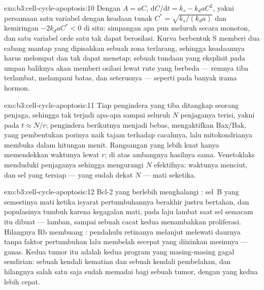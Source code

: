\begin{solution}{exo:b3:cell-cycle-apoptosis:10}
Dengan $A = aC$, $\mathrm{d}C/\mathrm{d}t = k_{s} - k_{d}aC^{2}$, yakni
persamaan satu variabel dengan keadaan tunak $C^{*} = \sqrt{k_{s}/(k_{d}a)}$
dan kemiringan $-2k_{d}aC^{*} < 0$ di situ: simpangan apa pun meluruh
secara monoton, dan satu variabel orde satu tak dapat berosilasi. Kurva
berbentuk S memberi dua cabang mantap yang dipisahkan sebuah zona terlarang,
sehingga keadaannya harus melompat dan tak dapat menetap; sebuah tundaan yang
eksplisit pada umpan baliknya akan memberi osilasi lewat rute yang berbeda ---
remnya tiba terlambat, melampaui batas, dan seterusnya --- seperti pada banyak
irama hormon.
\end{solution}

\begin{solution}{exo:b3:cell-cycle-apoptosis:11}
Tiap pengindera yang tiba ditangkap seorang penjaga, sehingga tak terjadi
apa-apa sampai seluruh $N$ penjaganya terisi, yakni pada $t \approx N/r$;
pengindera berikutnya menjadi bebas, mengaktifkan Bax/Bak, yang pembentukan
porinya naik tajam terhadap cacahnya, lalu mitokondrianya membuka dalam
hitungan menit. Rangsangan yang lebih kuat hanya memendekkan waktunya lewat
$r$; di atas ambangnya hasilnya sama. Venetoklaks menduduki penjaganya
sehingga mengurangi $N$ efektifnya: waktunya menciut, dan sel yang tersiap ---
yang sudah dekat $N$ --- mati seketika.
\end{solution}

\begin{solution}{exo:b3:cell-cycle-apoptosis:12}
Bcl-2 yang berlebih menghalangi : sel~B yang semestinya mati
ketika isyarat pertumbuhannya berakhir justru bertahan, dan populasinya tumbuh
karena kegagalan mati, pada laju lambat saat sel semacam itu dibuat ---
lamban, sampai sebuah cacat kedua menambahkan proliferasi. Hilangnya Rb
membuang : pendahulu retinanya melanjut melewati daurnya
tanpa faktor pertumbuhan lalu membelah secepat yang diizinkan mesinnya ---
ganas. Kedua tumor itu adalah kedua program yang masing-masing gagal
sendirian: sebuah kendali kematian dan sebuah kendali pembelahan, dan
hilangnya salah satu saja sudah memadai bagi sebuah tumor, dengan yang kedua
lebih cepat.
\end{solution}

